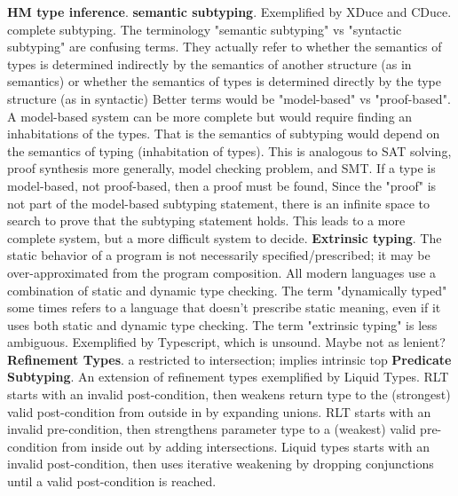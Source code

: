 \documentclass[letterpaper]{llncs}
\begin{document}
\textbf{HM type inference}.  \newline
\textbf{semantic subtyping}. Exemplified by XDuce and CDuce. complete subtyping.
The terminology "semantic subtyping" vs "syntactic subtyping" are confusing terms. 
They actually refer 
to whether the semantics of types is determined indirectly by the semantics of another structure (as in semantics)
or whether the semantics of types is determined directly by the type structure (as in syntactic) 
Better terms would be "model-based" vs "proof-based".
A model-based system can be more complete but would require finding an inhabitations of the types.
That is the semantics of subtyping would depend on the semantics of typing (inhabitation of types).
This is analogous to SAT solving, proof synthesis more generally, model checking problem, and SMT.
If a type is model-based, not proof-based, then a proof must be found,
Since the "proof" is not part of the model-based subtyping statement, 
there is an infinite space to search to prove that the subtyping statement holds.
This leads to a more complete system, but a more difficult system to decide.
\newline
\textbf{Extrinsic typing}. The static behavior of a program is not necessarily specified/prescribed; 
it may be over-approximated from the program composition. 
All modern languages use a combination of static and dynamic type checking.
The term "dynamically typed" some times refers to a language that doesn't prescribe static meaning,
even if it uses both static and dynamic type checking. The term "extrinsic typing" is less ambiguous.
Exemplified by Typescript, which is unsound. Maybe not as lenient?  
\newline
\textbf{Refinement Types}. a restricted to intersection; implies intrinsic top\newline
\textbf{Predicate Subtyping}. An extension of refinement types exemplified by Liquid Types.
RLT starts with an invalid post-condition, then weakens return type to the (strongest) valid post-condition from outside in by expanding unions. 
RLT starts with an invalid pre-condition, then strengthens parameter type to a (weakest) valid pre-condition from inside out by adding intersections. 
Liquid types starts with an invalid post-condition, then uses iterative weakening by dropping conjunctions until a valid post-condition is reached.
\newline
\end{document}
